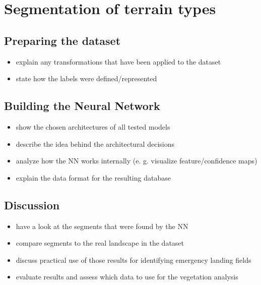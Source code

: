 \section{Segmentation of terrain types}

\subsection{Preparing the dataset}
\begin{itemize}
    \item explain any transformations that have been applied to the dataset
    \item state how the labels were defined/represented
\end{itemize}

\subsection{Building the Neural Network}
\begin{itemize}
    \item show the chosen architectures of all tested models
    \item describe the idea behind the architectural decisions
    \item analyze how the NN works internally (e. g. visualize feature/confidence maps)
    \item explain the data format for the resulting database
\end{itemize}

\subsection{Discussion}
\begin{itemize}
    \item have a look at the segments that were found by the NN
    \item compare segments to the real landscape in the dataset
    \item discuss practical use of those results for identifying emergency landing fields
    \item evaluate results and assess which data to use for the vegetation analysis
\end{itemize}

\newpage
